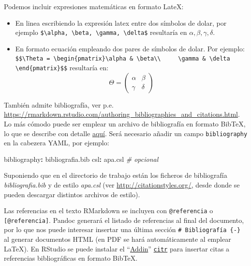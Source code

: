 \documentclass[
]{book}
\newenvironment{Shaded}{\begin{snugshade}}{\end{snugshade}}
\newcommand{\AttributeTok}[1]{\textcolor[rgb]{0.77,0.63,0.00}{#1}}
\newcommand{\CommentTok}[1]{\textcolor[rgb]{0.56,0.35,0.01}{\textit{#1}}}
\newcommand{\FunctionTok}[1]{\textcolor[rgb]{0.00,0.00,0.00}{#1}}
\newcommand{\KeywordTok}[1]{\textcolor[rgb]{0.13,0.29,0.53}{\textbf{#1}}}
\theoremstyle{definition}
\theoremstyle{definition}
\theoremstyle{definition}
\theoremstyle{definition}
\theoremstyle{remark}
\begin{document}
Podemos incluir expresiones matemáticas en formato LateX:

\begin{itemize}
\item
  En linea escribiendo la expresión latex entre dos símbolos de dolar,
  por ejemplo \texttt{\$\textbackslash{}alpha,\ \textbackslash{}beta,\ \textbackslash{}gamma,\ \textbackslash{}delta\$}
  resultaría en \(\alpha, \beta, \gamma, \delta\).
\item
  En formato ecuación empleando dos pares de símbolos de dolar. Por ejemplo:
  \texttt{\$\$\textbackslash{}Theta\ =\ \textbackslash{}begin\{pmatrix\}\textbackslash{}alpha\ \&\ \textbackslash{}beta\textbackslash{}\textbackslash{}\ \ \ \ \ \textbackslash{}gamma\ \&\ \textbackslash{}delta\ \ \ \ \ \textbackslash{}end\{pmatrix\}\$\$}
  resultaría en:
  \[\Theta = \begin{pmatrix}\alpha & \beta\\
  \gamma & \delta
  \end{pmatrix}\]
\end{itemize}

También admite bibliografía, ver p.e. \url{https://rmarkdown.rstudio.com/authoring_bibliographies_and_citations.html}.
Lo más cómodo puede ser emplear un archivo de bibliografía en formato BibTeX,
lo que se describe con detalle \href{https://bookdown.org/yihui/bookdown/citations.html}{aquí}.
Será necesario añadir un campo \texttt{bibliography} en la cabezera YAML, por ejemplo:

\begin{Shaded}
\begin{Highlighting}[]
\FunctionTok{bibliography}\KeywordTok{:}\AttributeTok{ bibliografia.bib}
\FunctionTok{csl}\KeywordTok{:}\AttributeTok{ apa.csl}\CommentTok{  \# opcional}
\end{Highlighting}
\end{Shaded}

Suponiendo que en el directorio de trabajo están los ficheros de bibliografía \emph{bibliografia.bib}
y de estilo \emph{apa.csl} (ver \url{http://citationstyles.org/}, desde donde se pueden descargar
distintos archivos de estilo).

Las referencias en el texto RMarkdown se incluyen con \texttt{@referencia} o \texttt{{[}@referencia{]}}.
Pandoc generará el listado de referencias al final del documento,
por lo que nos puede interesar insertar una última sección \texttt{\#\ Bibliografía\ \{-\}}
al generar documentos HTML (en PDF se hará automáticamente al emplear LaTeX).
En RStudio se puede instalar el ``\href{https://rstudio.github.io/rstudioaddins/}{Addin}''
\href{https://github.com/crsh/citr}{\texttt{citr}} para insertar
citas a referencias bibliográficas en formato BibTeX.
\end{document}

